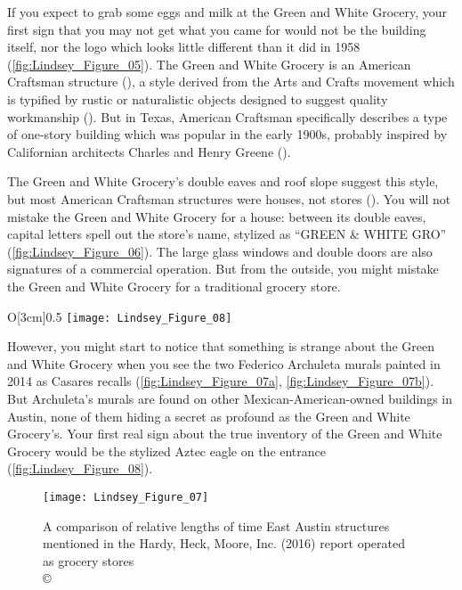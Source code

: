 
If you expect to grab some eggs and milk at the Green and White Grocery, your first sign that you may not get what you came for would not be the building itself, nor the logo which looks little different than it did in 1958 (\cref{fig:Lindsey_Figure_05}). The Green and White Grocery is an American Craftsman structure (\cite[75-76]{hardy}), a style derived from the Arts and Crafts movement which is typified by rustic or naturalistic objects designed to suggest quality workmanship (\cite[42-56]{frampton}). But in Texas, American Craftsman specifically describes a type of one-story building which was popular in the early 1900s, probably inspired by Californian architects Charles and Henry Greene (\cite{robinson}).



The Green and White Grocery's double eaves and roof slope suggest this style, but most American Craftsman structures were houses, not stores (\cite{robinson}). You will not mistake the Green and White Grocery for a house: between its double eaves, capital letters spell out the store's name, stylized as “GREEN \& WHITE GRO” (\cref{fig:Lindsey_Figure_06}). The large glass windows and double doors are also signatures of a commercial operation. But from the outside, you might mistake the Green and White Grocery for a traditional grocery store.


\begin{wrapfigure}{O}[3cm]{0.5\textwidth}
	\texttt{[image: Lindsey\_Figure\_08]}
	\caption{The Aztec-style cuauhtli (eagle) on the door\\
		{\normalfont\scriptsize \copyright\
			\shortauthor rendering
	}}
	\label{fig:Lindsey_Figure_08}
\end{wrapfigure}
However, you might start to notice that something is strange about the Green and White Grocery when you see the two Federico Archuleta murals painted in 2014 as Casares recalls (\cref{fig:Lindsey_Figure_07a}, \cref{fig:Lindsey_Figure_07b}). But Archuleta's murals are found on other Mexican-American-owned buildings in Austin, none of them hiding a secret as profound as the Green and White Grocery's. Your first real sign about the true inventory of the Green and White Grocery would be the stylized Aztec eagle on the entrance (\cref{fig:Lindsey_Figure_08}).

\begin{figure}[!p]
	\texttt{[image: Lindsey\_Figure\_07]}
	\caption{A comparison of relative lengths of time East Austin structures mentioned in the Hardy, Heck, Moore, Inc. (2016) report operated as grocery stores\\
		{\normalfont\scriptsize \copyright\
			\shortauthor
	}}
	\label{fig:Lindsey_Figure_07}
\end{figure}



